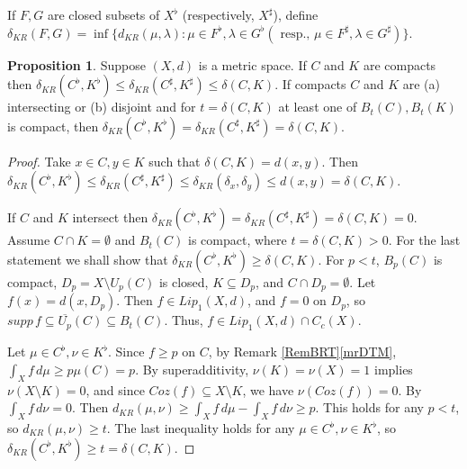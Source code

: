 \documentclass[sn-mathphys-num]{sn-jnl}%
\theoremstyle{thmstyleone}%
\theoremstyle{definition}
\newtheorem{proposition}[theorem]{Proposition}%
\begin{document}
If $F, G $ are closed subsets of $X^\flat$ (respectively, $X^\sharp$), define 
$\delta_{KR}(F,G) = \inf \{ d_{KR}(\mu, \lambda): \mu \in F^\flat, \lambda \in G^\flat (\text{ resp., } \mu \in F^\sharp,  \lambda \in G^\sharp) \} $.   

\begin{proposition} \label{KRstar}
Suppose $(X,d)$ is a metric space. 
If $C$ and $K$ are compacts then  $ \delta_{KR}(C^{\flat}, K^{\flat}) \le \delta_{KR}(C^\sharp,K^\sharp) \le  \delta(C,K)$. 
If  compacts  $C$ and $K$ are (a) intersecting or (b) disjoint and for $t = \delta(C,K)$ at least one of $B_t(C), B_t(K)$ is compact, then 
$ \delta_{KR}(C^{\flat},K^{\flat}) = \delta_{KR}(C^\sharp,K^\sharp) = \delta(C, K)$. 
\end{proposition}

\begin{proof}
Take $x \in C, y \in K$ such that $ \delta(C,K) = d(x,y)$. 
Then $ \delta_{KR}(C^{\flat},K^{\flat}) \le \delta_{KR}(C^\sharp,K^\sharp) \le  \delta_{KR}(\delta_x, \delta_y) \le d(x,y) = \delta(C,K)$.

If $C$ and $K$ intersect then $  \delta_{KR}(C^{\flat},K^{\flat}) =  \delta_{KR}(C^\sharp,K^\sharp) = \delta(C, K) =0$.
Assume $ C \cap K  = \emptyset$ and $B_t(C)$ is compact, where $ t =  \delta(C, K) >0$.
For the last statement we shall show that $ \delta_{KR}(C^{\flat},K^{\flat}) \ge \delta(C, K)$.
For $p < t$,  $B_p(C) $ is compact, $D_p = X \setminus U_p(C)$ is closed, $K \subseteq D_p$, and $C \cap D_p = \emptyset$. 
Let $f(x) = d(x, D_p)$. Then $f \in Lip_1(X, d)$, and $f= 0$ on $D_p$, 
so $ supp \, f \subseteq \overline{U_p}(C) \subseteq B_t(C)$. Thus, $ f \in Lip_1(X, d) \cap C_c(X)$.  

Let $ \mu \in C^{\flat}, \nu \in K^{\flat}$. Since $ f \ge p$ on $C$,  by Remark \ref{RemBRT}\ref{mrDTM}, $ \int_X f\, d\mu \ge p \mu(C) =  p$.
By superadditivity, $ \nu(K) = \nu(X) =1$ implies $\nu(X \setminus K) = 0$, and since $ Coz(f) \subseteq X \setminus K$, we have $ \nu(Coz(f)) = 0$. 
By \cite[Th. 49]{Butler:Integration} $\int_X f \, d\nu = 0$. Then
$ d_{KR} (\mu, \nu) \ge \int_X f \, d\mu -   \int_X f \, d\nu \ge p.$
This holds for any $ p < t$, so $d_{KR} (\mu, \nu) \ge t $. The last inequality holds for any   $ \mu \in C^{\flat}, \nu \in K^{\flat}$, 
so  $\delta_{KR}(C^{\flat},K^{\flat}) \ge t = \delta(C,K)$. 
\end{proof} 
\end{document}

